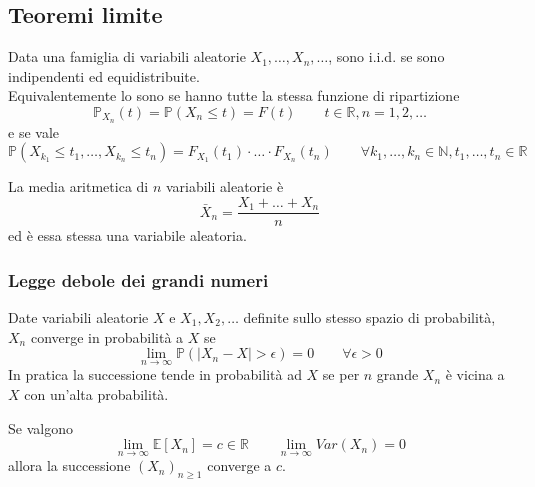 \subsection{Teoremi limite}
\begin{definition}
	Data una famiglia di variabili aleatorie $X_1, \ldots, X_n, \ldots$, sono i.i.d. se sono indipendenti ed equidistribuite.\\
	Equivalentemente lo sono se hanno tutte la stessa funzione di ripartizione
	\begin{equation}
		\mathbb{P}_{X_n}(t) = \mathbb{P}(X_n \leq t) = F(t) \quad\quad t \in \mathbb{R}, n=1,2,\ldots
	\end{equation}
	e se vale
	\begin{equation}
		\mathbb{P}(X_{k_1} \leq t_1, \ldots, X_{k_n} \leq t_n) = F_{X_1}(t_1) \cdot \ldots \cdot F_{X_n}(t_n) \quad\quad \forall k_1, \ldots, k_n \in \mathbb{N}, t_1, \ldots, t_n \in \mathbb{R}
	\end{equation}
\end{definition}

\begin{definition}
	La media aritmetica di $n$ variabili aleatorie è
	\begin{equation}
		\bar{X}_n = \frac{X_1 + \ldots + X_n}{n}
	\end{equation}
	ed è essa stessa una variabile aleatoria.
\end{definition}

\subsubsection{Legge debole dei grandi numeri}
\begin{definition}
	Date variabili aleatorie $X$ e $X_1, X_2, \ldots$ definite sullo stesso spazio di probabilità, $X_n$ converge in probabilità a $X$ se
	\begin{equation}
		\lim_{n \to \infty}\mathbb{P}(\lvert X_n - X \rvert > \epsilon ) = 0 \quad\quad \forall\epsilon > 0
	\end{equation}
	In pratica la successione tende in probabilità ad $X$ se per $n$ grande $X_n$ è vicina a $X$ con un'alta probabilità.
\end{definition}

\begin{proposition}
	Se valgono
	\begin{equation}
		\lim_{n \to \infty} \mathbb{E}[X_n] = c \in \mathbb{R} \quad\quad \lim_{n \to \infty} Var(X_n) = 0
	\end{equation}
	allora la successione $(X_n)_{n \geq 1}$ converge a $c$.
\end{proposition}

